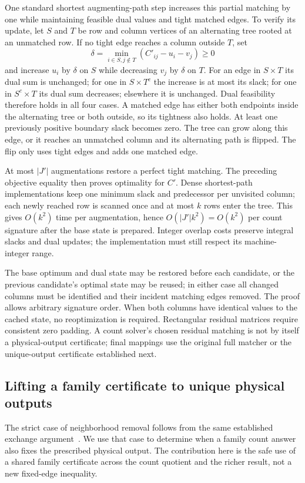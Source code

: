 \documentclass[11pt]{article}
\begin{document}
One standard shortest augmenting-path step increases this partial matching by one while maintaining feasible dual values and tight matched edges. To verify its update, let $S$ and $T$ be row and column vertices of an alternating tree rooted at an unmatched row. If no tight edge reaches a column outside $T$, set
\begin{equation}
\delta=\min_{i\in S,j\notin T}(C'_{ij}-u_i-v_j)\ge0
\end{equation}
and increase $u_i$ by $\delta$ on $S$ while decreasing $v_j$ by $\delta$ on $T$. For an edge in $S\times T$ its dual sum is unchanged; for one in $S\times T^c$ the increase is at most its slack; for one in $S^c\times T$ its dual sum decreases; elsewhere it is unchanged. Dual feasibility therefore holds in all four cases. A matched edge has either both endpoints inside the alternating tree or both outside, so its tightness also holds. At least one previously positive boundary slack becomes zero. The tree can grow along this edge, or it reaches an unmatched column and its alternating path is flipped. The flip only uses tight edges and adds one matched edge.

At most $|J'|$ augmentations restore a perfect tight matching. The preceding objective equality then proves optimality for $C'$. Dense shortest-path implementations keep one minimum slack and predecessor per unvisited column; each newly reached row is scanned once and at most $k$ rows enter the tree. This gives $O(k^2)$ time per augmentation, hence $O(|J'|k^2)=O(k^2)$ per count signature after the base state is prepared. Integer overlap costs preserve integral slacks and dual updates; the implementation must still respect its machine-integer range.

The base optimum and dual state may be restored before each candidate, or the previous candidate's optimal state may be reused; in either case all changed columns must be identified and their incident matching edges removed. The proof allows arbitrary signature order. When both columns have identical values to the cached state, no reoptimization is required. Rectangular residual matrices require consistent zero padding. A count solver's chosen residual matching is not by itself a physical-output certificate; final mappings use the original full matcher or the unique-output certificate established next.

\subsection{Lifting a family certificate to unique physical outputs}\label{sec:unique-physical-lift}
The strict case of neighborhood removal follows from the same established exchange argument~\cite{grossmann2026hypergraph}. We use that case to determine when a family count answer also fixes the prescribed physical output. The contribution here is the safe use of a shared family certificate across the count quotient and the richer result, not a new fixed-edge inequality.
\end{document}
